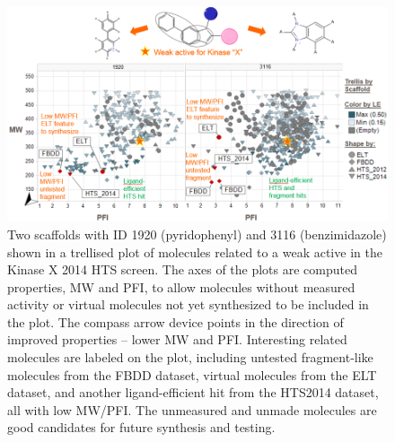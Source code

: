 \documentclass[journal=jacsat,manuscript=article]{achemso}
\begin{document}
\begin{figure}
\includegraphics[width=6in]{fig/KinaseX_ELT.png}
\caption{
Two scaffolds with ID 1920 (pyridophenyl) and 3116 (benzimidazole) shown in a trellised plot of molecules related to a weak active in the Kinase X 2014 HTS screen. The axes of the plots are computed properties, MW and PFI, to allow molecules without measured activity or virtual molecules not yet synthesized to be included in the plot. The compass arrow device points in the direction of improved properties -- lower MW and PFI. Interesting related molecules are labeled on the plot, including untested fragment-like molecules from the FBDD dataset, virtual molecules from the ELT dataset, and another ligand-efficient hit from the HTS2014 dataset, all with low MW/PFI. The unmeasured and unmade molecules are good candidates for future synthesis and testing.   
}
\label{fig:ELT}   
\end{figure}
\end{document}
